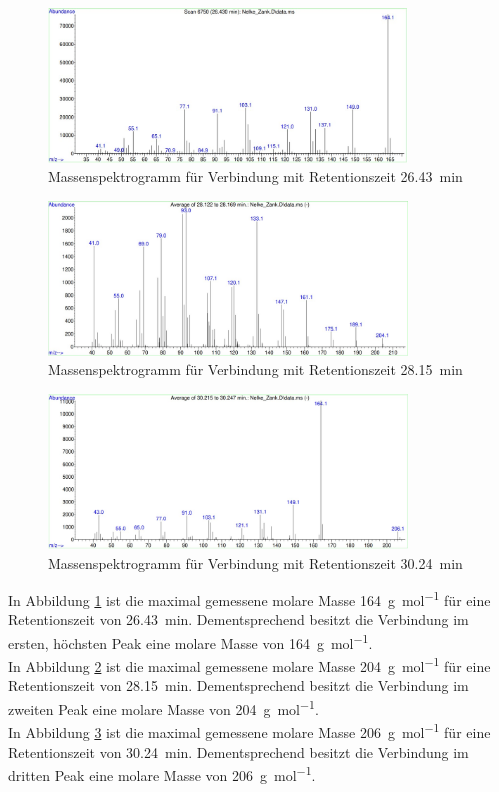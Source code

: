 \begin{figure}[h!]
	\centering
	\includegraphics[width=0.85\textwidth]{img/ms_164}
	\caption{Massenspektrogramm für Verbindung mit Retentionszeit \SI{26,43}{\minute}}
	\label{fig:ms_164}
\end{figure}
\FloatBarrier
\begin{figure}[h!]
	\centering
	\includegraphics[width=0.85\textwidth]{img/ms_204}
	\caption{Massenspektrogramm für Verbindung mit Retentionszeit \SI{28,15}{\minute}}
	\label{fig:ms_204}
\end{figure}
\FloatBarrier
\begin{figure}[h!]
	\centering
	\includegraphics[width=0.85\textwidth]{img/ms_206}
	\caption{Massenspektrogramm für Verbindung mit Retentionszeit \SI{30,24}{\minute}}
	\label{fig:ms_206}
\end{figure}
\FloatBarrier

In Abbildung \ref{fig:ms_164} ist die maximal gemessene molare Masse \SI{164}{\gram \per \mole} für eine Retentionszeit von \SI{26,43}{\minute}. Dementsprechend besitzt die Verbindung im ersten, höchsten Peak eine molare Masse von \SI{164}{\gram \per \mole}.\\
\newpage
In Abbildung \ref{fig:ms_204} ist die maximal gemessene molare Masse \SI{204}{\gram \per \mole} für eine Retentionszeit von \SI{28,15}{\minute}. Dementsprechend besitzt die Verbindung im zweiten Peak eine molare Masse von \SI{204}{\gram \per \mole}.\\
In Abbildung \ref{fig:ms_206} ist die maximal gemessene molare Masse \SI{206}{\gram \per \mole} für eine Retentionszeit von \SI{30,24}{\minute}. Dementsprechend besitzt die Verbindung im dritten Peak eine molare Masse von \SI{206}{\gram \per \mole}.

